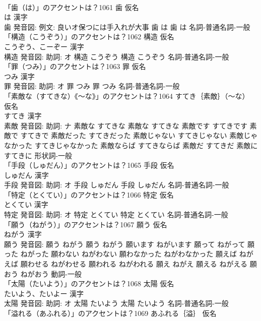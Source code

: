 \documentclass[8pt]{extreport}
\begin{document}
\begin{CJK}{UTF8}{min}
\\	「歯（は）」のアクセントは？1061	歯 仮名　
\\	は 漢字　
\\	歯 発音図: 例文: 良いオ保つには手入れが大事	歯 は		歯 は				名詞-普通名詞-一般 
\\	「構造（こうぞう）」のアクセントは？1062	構造 仮名　
\\	こうぞう、こーぞー 漢字　
\\	構造 発音図: 助詞: オ	構造 こうぞう		構造 こうぞう				名詞-普通名詞-一般 
\\	「罪（つみ）」のアクセントは？1063	罪 仮名　
\\	つみ 漢字　
\\	罪 発音図: 助詞: オ	罪 つみ		罪 つみ				名詞-普通名詞-一般 
\\	「素敵な（すてきな）《〜な》」のアクセントは？1064	すてき｛素敵｝（〜な） 仮名　
\\	すてき 漢字　
\\	素敵 発音図: 助詞: ナ	素敵な すてきな		素敵な すてきな 素敵です すてきです 素敵で すてきで 素敵だった すてきだった 素敵じゃない すてきじゃない 素敵じゃなかった すてきじゃなかった 素敵ならば すてきならば 素敵だ すてきだ 素敵に すてきに				形状詞-一般 
\\	「手段（しゅだん）」のアクセントは？1065	手段 仮名　
\\	しゅだん 漢字　
\\	手段 発音図: 助詞: オ	手段 しゅだん		手段 しゅだん				名詞-普通名詞-一般 
\\	「特定（とくてい）」のアクセントは？1066	特定 仮名　
\\	とくてい 漢字　
\\	特定 発音図: 助詞: オ	特定 とくてい		特定 とくてい				名詞-普通名詞-一般 
\\	「願う（ねがう）」のアクセントは？1067	願う 仮名　
\\	ねがう 漢字　
\\	願う 発音図:	願う ねがう		願う ねがう 願います ねがいます 願って ねがって 願った ねがった 願わない ねがわない 願わなかった ねがわなかった 願えば ねがえば 願わせる ねがわせる 願われる ねがわれる 願え ねがえ 願える ねがえる 願おう ねがおう				動詞-一般 
\\	「太陽（たいよう）」のアクセントは？1068	太陽 仮名　
\\	たいよう、たいよー 漢字　
\\	太陽 発音図: 助詞: オ	太陽 たいよう		太陽 たいよう				名詞-普通名詞-一般 
\\	「溢れる（あふれる）」のアクセントは？1069	あふれる｛溢｝ 仮名　

\end{CJK}
\end{document}

